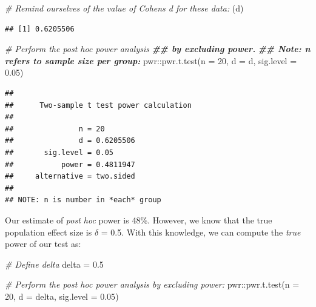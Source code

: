\documentclass[
]{book}
\newenvironment{Shaded}{\begin{snugshade}}{\end{snugshade}}
\newcommand{\AttributeTok}[1]{\textcolor[rgb]{0.77,0.63,0.00}{#1}}
\newcommand{\CommentTok}[1]{\textcolor[rgb]{0.56,0.35,0.01}{\textit{#1}}}
\newcommand{\DecValTok}[1]{\textcolor[rgb]{0.00,0.00,0.81}{#1}}
\newcommand{\DocumentationTok}[1]{\textcolor[rgb]{0.56,0.35,0.01}{\textbf{\textit{#1}}}}
\newcommand{\FloatTok}[1]{\textcolor[rgb]{0.00,0.00,0.81}{#1}}
\newcommand{\FunctionTok}[1]{\textcolor[rgb]{0.00,0.00,0.00}{#1}}
\newcommand{\NormalTok}[1]{#1}
\newcommand{\OtherTok}[1]{\textcolor[rgb]{0.56,0.35,0.01}{#1}}
\newcommand{\SpecialCharTok}[1]{\textcolor[rgb]{0.00,0.00,0.00}{#1}}
\begin{document}
\begin{Shaded}
\begin{Highlighting}[]
\CommentTok{\# Remind ourselves of the value of Cohen\textquotesingle{}s d for these data:}
\NormalTok{(d)}
\end{Highlighting}
\end{Shaded}

\begin{verbatim}
## [1] 0.6205506
\end{verbatim}

\begin{Shaded}
\begin{Highlighting}[]
\CommentTok{\# Perform the post hoc power analysis}
\DocumentationTok{\#\# by excluding \textasciigrave{}power\textasciigrave{}. }
\DocumentationTok{\#\# Note: \textasciigrave{}n\textasciigrave{} refers to sample size \textquotesingle{}per group\textquotesingle{}:}
\NormalTok{pwr}\SpecialCharTok{::}\FunctionTok{pwr.t.test}\NormalTok{(}\AttributeTok{n =} \DecValTok{20}\NormalTok{, }\AttributeTok{d =}\NormalTok{ d, }\AttributeTok{sig.level =} \FloatTok{0.05}\NormalTok{)}
\end{Highlighting}
\end{Shaded}

\begin{verbatim}
## 
##      Two-sample t test power calculation 
## 
##               n = 20
##               d = 0.6205506
##       sig.level = 0.05
##           power = 0.4811947
##     alternative = two.sided
## 
## NOTE: n is number in *each* group
\end{verbatim}

Our estimate of \emph{post hoc} power is 48\%. However, we know that the true population effect size is \(\delta\) = 0.5. With this knowledge, we can compute the \emph{true} power of our test as:

\begin{Shaded}
\begin{Highlighting}[]
\CommentTok{\# Define delta}
\NormalTok{delta }\OtherTok{=} \FloatTok{0.5}

\CommentTok{\# Perform the post hoc power analysis by excluding \textasciigrave{}power\textasciigrave{}:}
\NormalTok{pwr}\SpecialCharTok{::}\FunctionTok{pwr.t.test}\NormalTok{(}\AttributeTok{n =} \DecValTok{20}\NormalTok{, }\AttributeTok{d =}\NormalTok{ delta, }\AttributeTok{sig.level =} \FloatTok{0.05}\NormalTok{)}
\end{Highlighting}
\end{Shaded}
\end{document}
